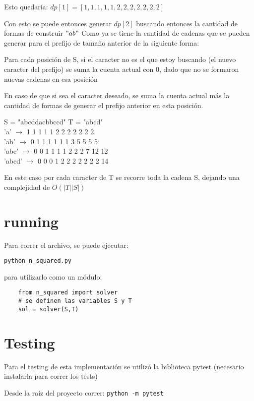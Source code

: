\documentclass{article}
\begin{document}
Esto quedaría: $dp[1] = [1,1,1,1,1,2,2,2,2,2,2,2]$

Con esto se puede entonces generar $dp[2]$ buscando entonces la cantidad de formas de construir $"ab"$
Como ya se tiene la cantidad de cadenas que se pueden generar para el prefijo de tamaño anterior de la siguiente forma:

Para cada posición de S, si el caracter no es el que estoy buscando (el nuevo caracter del prefijo)
se suma la cuenta actual con 0, dado que no se formaron nuevas cadenas en esa posición

En caso de que si sea el caracter deseado, se suma la cuenta actual más la cantidad de formas de generar el prefijo anterior en esta posición.

\begin{table}
    S = "abcddacbbccd"  T = "abcd" \\
    'a' $ \rightarrow$ 1 1 1 1 1 2 2 2 2 2 2 2\\ 
    'ab' $ \rightarrow$ 0 1 1 1 1 1 1 3 5 5 5 5 \\
    'abc' $ \rightarrow$ 0 0 1 1 1 1 2 2 2 7 12 12\\ 
    'abcd' $\rightarrow$ 0 0 0 1 2 2 2 2 2 2 2 14

\end{table}

En este caso por cada caracter de T se recorre toda la cadena S, dejando una complejidad de $O(|T||S|)$

\section{running}

Para correr el archivo, se puede ejecutar:

\texttt{python n\_squared.py}

para utilizarlo como un módulo:

\begin{lstlisting}
    from n_squared import solver
    # se definen las variables S y T
    sol = solver(S,T)
\end{lstlisting}

\section{Testing}
Para el testing de esta implementación se utilizó la biblioteca pytest (necesario instalarla para correr los tests)

Desde la raíz del proyecto correr:
\texttt{python -m pytest}
\end{document}
